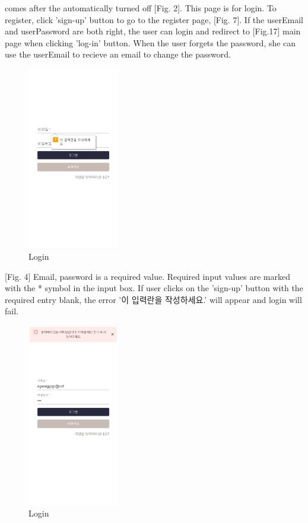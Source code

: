 \documentclass[conference]{IEEEtran}
\begin{document}
\begin{itemize}
    [Fig. 3] comes after the automatically turned off [Fig. 2].  This page is for login. To register, click 'sign-up' button to go to the register page, [Fig. 7]. If the userEmail and userPassword are both right, the user can login and redirect to [Fig.17] main page when clicking 'log-in' button. When the user forgets the password, she can use the userEmail to recieve an email to change the password.

    \begin{figure}[htbp]
    \includegraphics[width=4cm, height=8cm, center]{lgin2.png}
    \caption{Login}
    \label{fig4}
    \end{figure}
    
    [Fig. 4] Email, password is a required value. Required input values are marked with the * symbol in the input box. If user clicks on the 'sign-up' button with the required entry blank, the error '이 입력란을 작성하세요.' will appear and login will fail.

    \begin{figure}[htbp]
    \includegraphics[width=4cm, height=8cm, center]{lginemerr.png}
    \caption{Login}
    \label{fig5}
    \end{figure}
    

\end{itemize}
\end{document}
